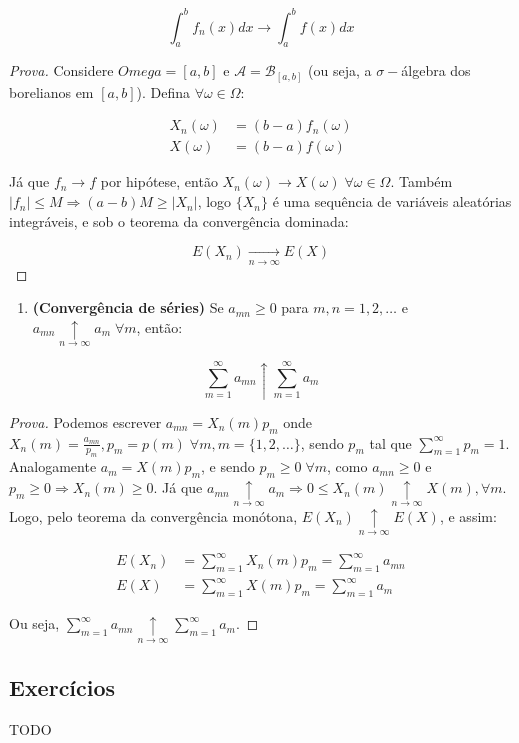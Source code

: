 \documentclass[
]{article}
\providecommand{\tightlist}{%
  \setlength{\itemsep}{0pt}\setlength{\parskip}{0pt}}
\theoremstyle{definition}
\theoremstyle{definition}
\theoremstyle{definition}
\theoremstyle{definition}
\theoremstyle{remark}
\begin{document}
\begin{equation*}
\int_{a}^{b}f_{n}(x)dx \to \int_{a}^{b}f(x)dx
\end{equation*}

\begin{proof}[Prova]
Considere \(Omega = [a,b]\) e \(\mathcal{A} = \mathcal{B}_{[a,b]}\) (ou seja, a \(\sigma-\)álgebra dos borelianos em \([a,b]\)). Defina \(\forall \omega \in \Omega\):

\begin{align*}
X_{n}(\omega) &= (b-a)f_{n}(\omega) \\
X(\omega) &= (b-a)f(\omega)
\end{align*}

Já que \(f_{n} \to f\) por hipótese, então \(X_{n}(\omega) \to X(\omega) \; \forall \omega \in \Omega\). Também \(|f_{n}| \le M \Rightarrow (a-b)M \ge |X_{n}|\), logo \(\{X_{n}\}\) é uma sequência de variáveis aleatórias integráveis, e sob o teorema da convergência dominada:

\begin{equation*}
E(X_{n}) \underset{n \to \infty}{\longrightarrow}E(X)
\end{equation*}
\end{proof}

\begin{enumerate}
\def\labelenumi{\arabic{enumi}.}
\setcounter{enumi}{3}
\tightlist
\item
  \textbf{(Convergência de séries)} Se \(a_{mn} \ge 0\) para \(m,n = 1,2,\ldots\) e \(a_{mn} \underset{n \to \infty}{\uparrow}a_{m} \; \forall m\), então:
\end{enumerate}

\begin{equation*}
\sum_{m=1}^{\infty}a_{mn} \uparrow \sum_{m=1}^{\infty}a_{m}
\end{equation*}

\begin{proof}[Prova]
Podemos escrever \(a_{mn} = X_{n}(m)p_{m}\) onde \(X_{n}(m) = \frac{a_{mn}}{p_{m}}, p_{m} = p(m) \; \forall m, m = \{1,2,\ldots\}\), sendo \(p_{m}\) tal que \(\sum_{m=1}^{\infty}p_{m} = 1\). Analogamente \(a_{m} = X(m)p_{m}\), e sendo \(p_{m} \ge 0 \; \forall m\), como \(a_{mn} \ge 0\) e \(p_{m} \ge 0 \Rightarrow X_{n}(m) \ge 0\). Já que \(a_{mn} \underset{n \to \infty}{\uparrow}a_{m} \Rightarrow 0 \le X_{n}(m) \underset{n \to \infty}{\uparrow} X(m), \forall m\). Logo, pelo teorema da convergência monótona, \(E(X_{n}) \underset{n \to \infty}{\uparrow} E(X)\), e assim:

\begin{align*}
E(X_{n}) &= \sum_{m=1}^{\infty}X_{n}(m)p_{m} = \sum_{m=1}^{\infty}a_{mn} \\
E(X) &= \sum_{m=1}^{\infty}X(m)p_{m} = \sum_{m=1}^{\infty}a_{m}
\end{align*}

Ou seja, \(\sum_{m=1}^{\infty}a_{mn} \underset{n \to \infty}{\uparrow} \sum_{m=1}^{\infty}a_{m}\).
\end{proof}

\newpage

\hypertarget{exercuxedcios-2}{%
\subsection{Exercícios}\label{exercuxedcios-2}}

TODO

\newpage
\end{document}
